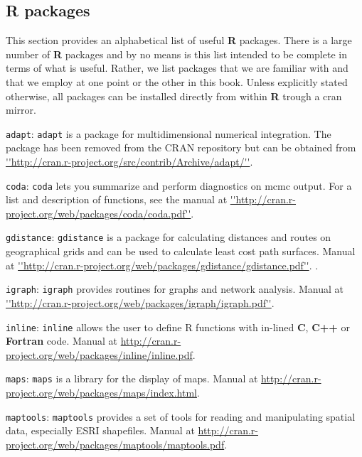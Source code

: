 \subsection{R packages}
This section provides an alphabetical list of useful {\bf R}  packages. There is a large number of {\bf R} packages and by no means is this list intended to be complete in terms of what is useful. Rather, we list packages that we are familiar with and that we employ at one point or the other in this book. Unless explicitly stated otherwise, all packages can be installed directly from within {\bf R} trough a cran mirror. 

 {\flushleft \tt adapt}:
\mbox{\tt adapt} \citep{genz_etal:2007} is a package for multidimensional numerical integration.
The package has been removed from the CRAN repository but can be obtained from \url{''http://cran.r-project.org/src/contrib/Archive/adapt/''}.

 {\flushleft \tt coda}: 
\mbox{\tt coda} \citep{plummer_etal:2006} lets you summarize and perform diagnostics on mcmc output. For a list and description of functions, see the manual at \url{''http://cran.r-project.org/web/packages/coda/coda.pdf''}. 

 {\flushleft \tt gdistance}:
\mbox{\tt gdistance} \citep{vanetten:2011} is a package for calculating distances and routes on geographical grids and can be used to calculate least cost path surfaces. Manual at \url{''http://cran.r-project.org/web/packages/gdistance/gdistance.pdf''}. .
 
 {\flushleft \tt igraph}:
  \mbox{\tt igraph} \citep{csardi:2010} provides routines for graphs and network analysis. Manual at \url{''http://cran.r-project.org/web/packages/igraph/igraph.pdf''}. 

 {\flushleft \tt inline}:
  \mbox{\tt inline} \citep{sklyar_etal:2010} allows the user to define R functions with in-lined {\bf C}, {\bf C++} or {\bf Fortran} code. Manual at \url{http://cran.r-project.org/web/packages/inline/inline.pdf}. 
  
 {\flushleft \tt maps}: 
\mbox{\tt maps} \citep{becker_etal:2012} is a library for the display of maps. Manual at \url{http://cran.r-project.org/web/packages/maps/index.html}. 

 {\flushleft \tt maptools}:
\mbox{\tt maptools} \citep{bivand_levin-koh:2013} provides a set of tools for reading and manipulating spatial data, especially ESRI shapefiles. Manual at \url{http://cran.r-project.org/web/packages/maptools/maptools.pdf}. 


